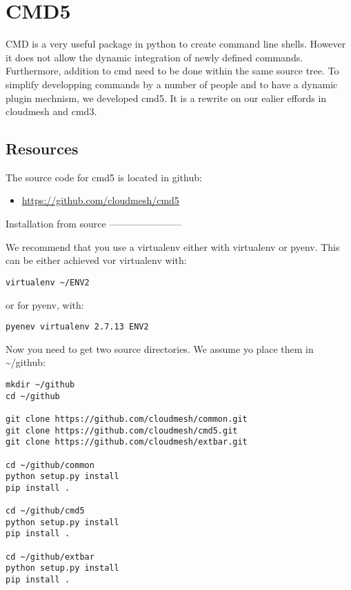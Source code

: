 \section{CMD5}\label{cmd5}

CMD is a very useful package in python to create command line shells.
However it does not allow the dynamic integration of newly defined
commands. Furthermore, addition to cmd need to be done within the same
source tree. To simplify developping commands by a number of people and
to have a dynamic plugin mechnism, we developed cmd5. It is a rewrite on
our ealier effords in cloudmesh and cmd3.

\subsection{Resources}\label{resources}

The source code for cmd5 is located in github:

\begin{itemize}
\tightlist
\item
  \url{https://github.com/cloudmesh/cmd5}
\end{itemize}

Installation from source -----------------------

We recommend that you use a virtualenv either with virtualenv or pyenv.
This can be either achieved vor virtualenv with:

\begin{verbatim}
virtualenv ~/ENV2
\end{verbatim}

or for pyenv, with:

\begin{verbatim}
pyenev virtualenv 2.7.13 ENV2
\end{verbatim}

Now you need to get two source directories. We assume yo place them in
\textasciitilde{}/github:

\begin{verbatim}
mkdir ~/github
cd ~/github

git clone https://github.com/cloudmesh/common.git
git clone https://github.com/cloudmesh/cmd5.git
git clone https://github.com/cloudmesh/extbar.git

cd ~/github/common
python setup.py install
pip install .

cd ~/github/cmd5
python setup.py install
pip install .

cd ~/github/extbar
python setup.py install
pip install .
\end{verbatim}

